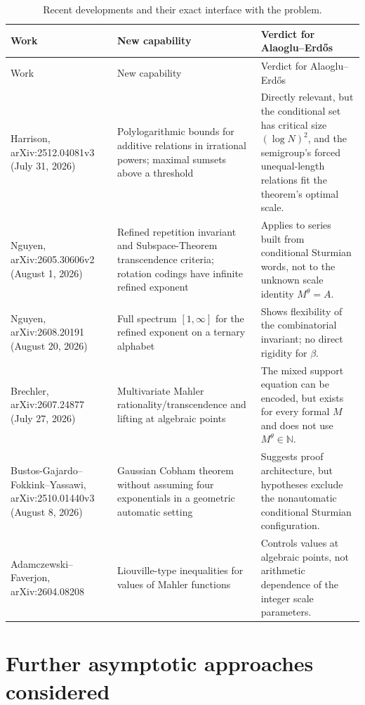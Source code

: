 \documentclass[11pt,oneside]{article}
\theoremstyle{definition}
\theoremstyle{remark}
\newcommand{\N}{\mathbb N}
\begin{document}
\begin{longtable}{L{0.19\textwidth}L{0.25\textwidth}L{0.48\textwidth}}
\caption{Recent developments and their exact interface with the problem.}\label{tab:recent}\\
\toprule
Work & New capability & Verdict for Alaoglu--Erd\H{o}s \\
\midrule
\endfirsthead
\toprule
Work & New capability & Verdict for Alaoglu--Erd\H{o}s \\
\midrule
\endhead
Harrison, arXiv:2512.04081v3 (July 31, 2026)
& Polylogarithmic bounds for additive relations in irrational powers; maximal sumsets above a threshold
& Directly relevant, but the conditional set has critical size $(\log N)^2$, and the semigroup's forced unequal-length relations fit the theorem's optimal scale. \\
\addlinespace
Nguyen, arXiv:2605.30606v2 (August 1, 2026)
& Refined repetition invariant and Subspace-Theorem transcendence criteria; rotation codings have infinite refined exponent
& Applies to series built from conditional Sturmian words, not to the unknown scale identity $M^\theta=A$. \\
\addlinespace
Nguyen, arXiv:2608.20191 (August 20, 2026)
& Full spectrum $[1,\infty]$ for the refined exponent on a ternary alphabet
& Shows flexibility of the combinatorial invariant; no direct rigidity for $\beta$. \\
\addlinespace
Brechler, arXiv:2607.24877 (July 27, 2026)
& Multivariate Mahler rationality/transcendence and lifting at algebraic points
& The mixed support equation can be encoded, but exists for every formal $M$ and does not use $M^\theta\in\N$. \\
\addlinespace
Bustos-Gajardo--Fokkink--Yassawi, arXiv:2510.01440v3 (August 8, 2026)
& Gaussian Cobham theorem without assuming four exponentials in a geometric automatic setting
& Suggests proof architecture, but hypotheses exclude the nonautomatic conditional Sturmian configuration. \\
\addlinespace
Adamczewski--Faverjon, arXiv:2604.08208
& Liouville-type inequalities for values of Mahler functions
& Controls values at algebraic points, not arithmetic dependence of the integer scale parameters. \\
\bottomrule
\end{longtable}

\section{Further asymptotic approaches considered}
\label{sec:further-approaches}
\end{document}
